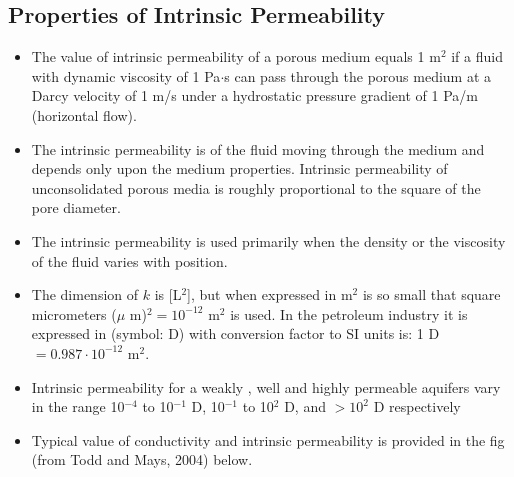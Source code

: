 \documentclass[letterpaper,10pt,english]{jupyterBook}
\let\sphinxpxdimen\pdfpxdimen\else\newdimen\sphinxpxdimen
\begin{document}
\subsection{Properties of Intrinsic Permeability}
\label{\detokenize{content/flow/L4/14_darcy_law_K:properties-of-intrinsic-permeability}}\begin{itemize}
\item {} 
\sphinxAtStartPar
The value of intrinsic permeability of a porous medium
equals 1 m\(^2\) if a fluid with dynamic viscosity of 1 Pa\(\cdot\)s can pass through the porous
medium at a Darcy velocity of 1 m/s under a hydrostatic pressure gradient of 1 Pa/m
(horizontal flow).

\item {} 
\sphinxAtStartPar
The intrinsic permeability is  of the fluid moving through the medium and depends only upon the medium properties. Intrinsic
permeability of unconsolidated porous media is roughly proportional to the square of
the pore diameter.

\item {} 
\sphinxAtStartPar
The intrinsic permeability is used primarily when the density or the viscosity of the
fluid varies with position.

\item {} 
\sphinxAtStartPar
The dimension of \(k\) is {[}L\(^2\){]}, but when expressed in m\(^2\) is so small that square
micrometers (\(\mu\) m)\(^2  = 10^{-12}\) m\(^2\) is used. In the petroleum industry it is expressed in 
(symbol: D) with conversion factor to SI units is:  1 D \(= 0.987\cdot 10^{-12}\) m\(^2\).

\item {} 
\sphinxAtStartPar
Intrinsic permeability for a weakly , well and
highly permeable aquifers vary in the range 10\(^{-4}\) to 10\(^{-1}\) D, 10\(^{-1}\) to 10\(^2\) D, and \(> 10^2\) D
respectively

\item {} 
\sphinxAtStartPar
Typical value of conductivity and intrinsic permeability is  provided in the fig (from Todd and Mays, 2004) below.

\end{itemize}

\noindent{\hspace*{\fill}\sphinxincludegraphics[height=500\sphinxpxdimen]{{L4_f7}.png}\hspace*{\fill}}
\end{document}

